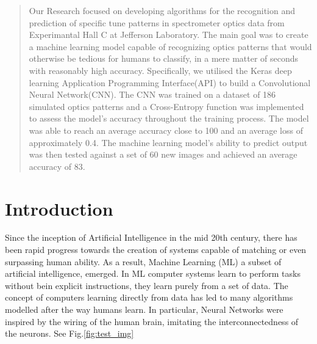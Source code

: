 \documentclass[conference]{IEEEtran}
\begin{document}
\begin{abstract}
Our Research focused on developing algorithms for the recognition and prediction of specific tune patterns in spectrometer optics data from Experimantal Hall C at Jefferson Laboratory. The main goal was to create a machine learning model capable of recognizing optics patterns that would otherwise be tedious for humans to classify, in a mere matter of seconds with reasonably high accuracy. Specifically, we utilised the Keras deep learning Application Programming Interface(API) to build a Convolutional Neural Network(CNN). The CNN was trained on a dataset of 186 simulated optics patterns and a Cross-Entropy function was implemented to assess the model's accuracy throughout the training process. The model was able to reach an average accuracy close to 100\text{\%} and an average loss of approximately 0.4. The machine learning model's ability to predict output was then tested against a set of 60 new images and achieved an average accuracy of 83\text{\%}.  
\end{abstract}


\section{Introduction}
Since the inception of Artificial Intelligence in the mid 20th century, there has been rapid progress towards the creation of systems capable of matching or even surpassing human ability. As a result, Machine Learning (ML) a subset of artificial intelligence, emerged. In ML computer systems learn to perform tasks without bein explicit instructions, they learn purely from a set of data. The concept of computers learning directly from data has led to many algorithms modelled after the way humans learn. In particular, Neural Networks were inspired by the wiring of the human brain, imitating the interconnectedness of the neurons.
 See Fig.\ref{fig:test_img}
\cite{NNPart1_VZ_2019}
\end{document}
